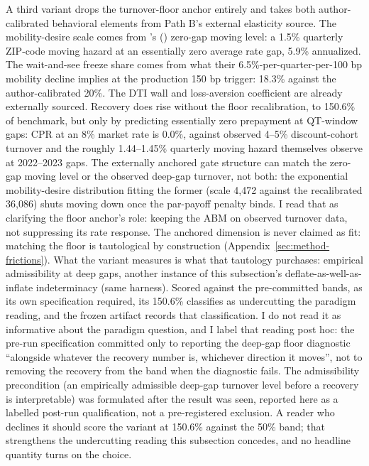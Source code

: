\documentclass[12pt]{article}
\newcommand{\citepos}[1]{\citeauthor{#1}'s (\citeyear{#1})}
\begin{document}
A third variant drops the turnover-floor anchor entirely and takes both author-calibrated behavioral elements from Path B's external elasticity source. The mobility-desire scale comes from \citepos{liebersohn2024} zero-gap moving level: a 1.5\% quarterly ZIP-code moving hazard at an essentially zero average rate gap, 5.9\% annualized. The wait-and-see freeze share comes from what their 6.5\%-per-quarter-per-100 bp mobility decline implies at the production 150 bp trigger: 18.3\% against the author-calibrated 20\%. The DTI wall and loss-aversion coefficient are already externally sourced. Recovery does rise without the floor recalibration, to 150.6\% of benchmark, but only by predicting essentially zero prepayment at QT-window gaps: CPR at an 8\% market rate is 0.0\%, against observed 4--5\% discount-cohort turnover and the roughly 1.44--1.45\% quarterly moving hazard \citet{liebersohn2024} themselves observe at 2022--2023 gaps. The externally anchored gate structure can match the zero-gap moving level or the observed deep-gap turnover, not both: the exponential mobility-desire distribution fitting the former (scale 4{,}472 against the recalibrated 36{,}086) shuts moving down once the par-payoff penalty binds. I read that as clarifying the floor anchor's role: keeping the ABM on observed turnover data, not suppressing its rate response. The anchored dimension is never claimed as fit: matching the floor is tautological by construction (Appendix~\ref{sec:method-frictions}). What the variant measures is what that tautology purchases: empirical admissibility at deep gaps, another instance of this subsection's deflate-as-well-as-inflate indeterminacy (same harness). Scored against the pre-committed bands, as its own specification required, its 150.6\% classifies as undercutting the paradigm reading, and the frozen artifact records that classification. I do not read it as informative about the paradigm question, and I label that reading post hoc: the pre-run specification committed only to reporting the deep-gap floor diagnostic ``alongside whatever the recovery number is, whichever direction it moves'', not to removing the recovery from the band when the diagnostic fails. The admissibility precondition (an empirically admissible deep-gap turnover level before a recovery is interpretable) was formulated after the result was seen, reported here as a labelled post-run qualification, not a pre-registered exclusion. A reader who declines it should score the variant at 150.6\% against the 50\% band; that strengthens the undercutting reading this subsection concedes, and no headline quantity turns on the choice.
\end{document}
